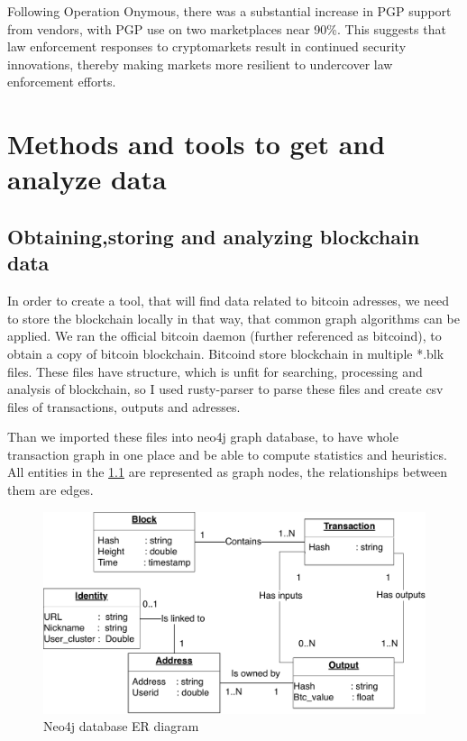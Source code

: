 \documentclass[
  digital, %
  table,   %
  lof,     %
  lot,     %
  oneside
]{fithesis3}
\begin{document}
Following Operation Onymous, there was a substantial increase in PGP support from vendors, with PGP use on two marketplaces near 90\%.
This suggests that law enforcement responses to cryptomarkets result in continued security innovations, thereby making markets more resilient to undercover law enforcement efforts.

\chapter{Methods and tools to get and analyze data}
\section{Obtaining,storing and analyzing blockchain data}
In order to create a tool, that will find data related to bitcoin adresses, we need to store the blockchain locally in that way, that common graph algorithms can be applied.
We ran the official bitcoin daemon (further referenced as bitcoind), to obtain a copy of bitcoin blockchain. Bitcoind store blockchain in multiple *.blk files.
These files have structure, which is unfit for searching, processing and analysis of blockchain, so I used rusty-parser to parse these files and create csv files of transactions, outputs and adresses.

Than we imported these files into neo4j graph database, to have whole transaction graph in one place and be able to compute statistics and heuristics.
All entities in the \ref{neo4jschema} are represented as graph nodes, the relationships between them are edges.
\begin{figure}[!htb]
    \centering
    \includegraphics[width=1\textwidth]{neo4j-schema}
    \caption{Neo4j database ER diagram}
    \label{neo4jschema}
\end{figure}
\end{document}
